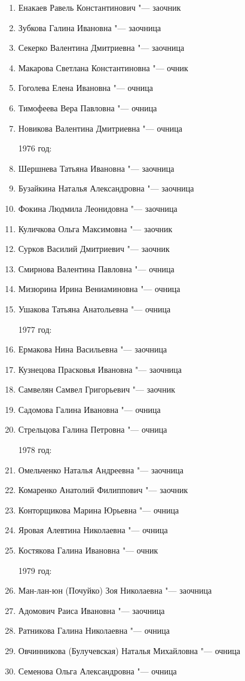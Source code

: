 \begin{enumerate}[nosep]
{1975 год:}
	\item Енакаев Равель Константинович "--- заочник
	\item Зубкова Галина Ивановна "--- заочница
	\item Секерко Валентина Дмитриевна "--- заочница
	\item Макарова Светлана Константиновна "--- очник
	\item Гоголева Елена Ивановна "--- очница
	\item Тимофеева Вера Павловна "--- очница
	\item Новикова Валентина Дмитриевна "--- очница
	
{1976 год:}
	\item Шершнева Татьяна Ивановна "--- заочница
	\item Бузайкина Наталья Александровна "--- заочница
	\item Фокина Людмила Леонидовна "--- заочница
	\item Куличкова Ольга Максимовна "--- заочник
	\item Сурков Василий Дмитриевич "--- заочник
	\item Смирнова Валентина Павловна "--- очница
	\item Мизюрина Ирина Вениаминовна "--- очница
	\item Ушакова Татьяна Анатольевна "--- очница
	
{1977 год:}
	\item Ермакова Нина Васильевна "--- заочница
	\item Кузнецова Прасковья Ивановна "--- заочница
	\item Самвелян Самвел Григорьевич "--- заочник
	\item Садомова Галина Ивановна "--- очница
	\item Стрельцова Галина Петровна "--- очница

{1978 год:}
	\item Омельченко Наталья Андреевна "--- заочница
	\item Комаренко Анатолий Филиппович "--- заочник
	\item Конторщикова Марина Юрьевна "--- очница
	\item Яровая Алевтина Николаевна "--- очница
	\item Костякова Галина Ивановна "--- очник

{1979 год:}
	\item Ман-лан-юн (Почуйко) Зоя Николаевна "--- заочница
	\item Адомович Раиса Ивановна "--- заочница
	\item Ратникова Галина Николаевна "--- очница
	\item Овчинникова (Булучевская) Наталья Михайловна "--- очница
	\item Семенова Ольга Александровна "--- очница


\end{enumerate}
